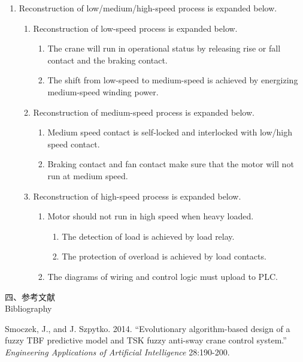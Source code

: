 \documentclass[a4paper]{article}
\renewcommand{\Large}{\fontsize{12pt}{\baselineskip}\selectfont}
\begin{document}
\begin{enumerate}
\begin{enumerate}
	\end{enumerate} 
\item Reconstruction of low/medium/high-speed process is expanded below.
	\begin{enumerate}
\item Reconstruction of low-speed process is expanded below.
		\begin{enumerate}
\item The crane will run in operational status by releasing rise or fall  contact and the braking contact.
\item The shift from low-speed to medium-speed is achieved by energizing medium-speed winding power.
		\end{enumerate}
\item Reconstruction of medium-speed process is expanded below.
	\begin{enumerate}
\item Medium speed contact is self-locked and  interlocked with  low/high speed contact.
\item Braking contact and fan contact make sure that the motor will not run at medium speed.
	\end{enumerate}
\item Reconstruction of high-speed process is expanded below.
	\begin{enumerate}
\item Motor should not run in high speed when heavy loaded.
	\begin{enumerate}
\item The detection of load is achieved  by load relay.
\item The protection of overload is achieved by load contacts.
	\end{enumerate}
\item The diagrams of wiring and control logic must upload to PLC.
	\end{enumerate} 
	\end{enumerate}
	\end{enumerate}

{ \Large 四、参考文献} \\
{ \Large Bibliography} 

\setlength{\hangindent}{4em}
Smoczek, J., and J. Szpytko. 2014. ``Evolutionary algorithm-based design of a fuzzy TBF predictive model and TSK fuzzy anti-sway crane control system.''
\textit{Engineering Applications of Artificial Intelligence} 28:190-200. \par
\end{document}
